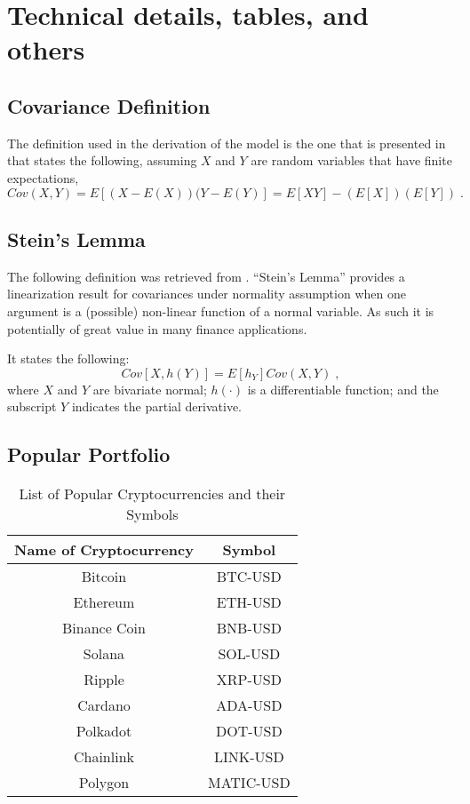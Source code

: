 
\chapter{Technical details, tables, and others}
\label{app_a}

\section{Covariance Definition}
\label{app: cov-def}
The definition used in the derivation of the model is the one that is presented in \parencite{Intro-prob-roussas} that states the following, assuming $X$ and $Y$ are random variables that have finite expectations,
\begin{equation}
	Cov(X,Y) = E\left[(X-E(X))(Y-E(Y)\right] = E\left[XY\right] - (E\left[X\right])(E\left[Y\right])\;.
\end{equation}

\section{Stein's Lemma}
\label{app: steins lemma}
The following definition was retrieved from \parencite{balvers2001}. ``Stein's Lemma'' provides a linearization result for covariances under normality assumption when one argument is a (possible) non-linear function of a normal variable. As such it is potentially of great value in many finance applications.

It states the following:
\begin{equation}
	Cov\left[X, h\left(Y\right)\right] = E\left[h_{Y}\right]Cov\left(X,Y\right)\;,
\end{equation}
where $X$ and $Y$ are bivariate normal; $h(\cdot)$ is a differentiable function; and the subscript $Y$ indicates the partial derivative.


\section{Popular Portfolio}
\begin{table}[h!]
	\centering
	\captionsetup{skip=0.5\baselineskip}
	\caption{List of Popular Cryptocurrencies and their Symbols}
	\begin{tabular}{|c|c|}
		\hline
		\textbf{Name of Cryptocurrency} & \textbf{Symbol} \\ \hline
		Bitcoin & BTC-USD \\ \hline
		Ethereum & ETH-USD \\ \hline
		Binance Coin & BNB-USD \\ \hline
		Solana & SOL-USD \\ \hline
		Ripple & XRP-USD \\ \hline
		Cardano & ADA-USD \\ \hline
		Polkadot & DOT-USD \\ \hline
		Chainlink & LINK-USD \\ \hline
		Polygon & MATIC-USD \\ \hline
	\end{tabular}
	\label{tab:cryptos}
\end{table}

